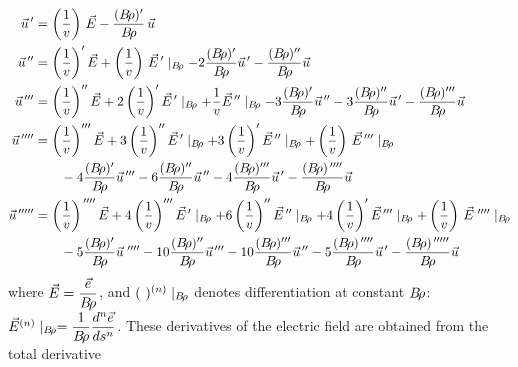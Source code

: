 \begin{equation}
	\begin{aligned}
		\vec  u^{\,\prime} 
		       & =  \left(\dfrac{1}{v}\right)\, \vec  E 
		             - \dfrac{(\Br )^\prime}{\Br} \, \vec  u\\
		\vec u^{\,\prime\prime} 
		       & =  \left(\dfrac{1}{v}\right)^\prime \vec  E 
		            + \left(\dfrac{1}{v}\right)\, \vec  E^{\,\prime} 
		            \mid_{ \Br}  -2 \dfrac{(\Br )^\prime }{ \Br} 
		             \vec  u^{\,\prime} -
		             \dfrac{(\Br)^{\prime\prime}}{\Br}  \vec  u \\
	    \vec  u^{\,\prime\prime\prime} 
	           &  = \left( \dfrac{1}{v}\right)^{\prime\prime}\vec  E
	               +2\left(\dfrac{1}{v}\right)^\prime \vec  E^{\,\prime} 
	               \mid_{ \Br} +\dfrac{1}{v} \vec  E^{\,\prime\prime} 
	               \mid_{ \Br} -3 \dfrac{(\Br )^\prime }{\Br}  \vec  u^{\,\prime\prime} 
	               -3 \dfrac{(\Br )^{\prime\prime}}{\Br}  \vec u^{\,\prime} 
	               - \dfrac{(\Br )^{\prime\prime\prime} }{\Br}  \vec  u \\
		\vec  u^{\quaprime}
		      & =  \left(\dfrac{1}{v}\right)^{\prime\prime\prime}  \vec  E 
		           +3\left(\dfrac{1}{v}\right)^{\prime\prime}\vec E^{\,\prime} \mid_{ \Br} 
		           +3\left( \dfrac{1}{v}\right)^\prime \vec  E^{\,\prime\prime} \mid_{\Br} 
		           +\left(\dfrac{1}{v}\right)\,\vec  E^{\,\prime\prime\prime} \mid_{\Br} \\
		      &  \qquad -4 \dfrac{(\Br )^\prime }{\Br}  \vec  u^{\,\prime\prime\prime} 
		           -6 \dfrac{(\Br )^{\prime\prime}}{\Br}  \vec  u^{\,\prime\prime} 
		           -4 \dfrac{(\Br )^{\prime\prime\prime} }{\Br}  \vec  u^{\,\prime} 
		           - \dfrac{(\Br )^{\quaprime}}{\Br}  \vec  u \\
             \vec  u^{\cinqprime}
		      & =  \left(\dfrac{1}{v}\right)^{\quaprime}  \vec  E 
		           +4\left(\dfrac{1}{v}\right)^{\prime\prime\prime}\vec E^{\,\prime} \mid_{ \Br} 
		           +6\left(\dfrac{1}{v}\right)^{\prime\prime}\vec E^{\,\prime\prime} \mid_{ \Br} 
		           +4\left( \dfrac{1}{v}\right)^\prime \vec  E^{\,\prime\prime\prime} \mid_{\Br} 
		           +\left(\dfrac{1}{v}\right)\,\vec  E^{\,\quaprime} \mid_{\Br} \\
		      &  \qquad -5 \dfrac{(\Br )^\prime }{\Br}  \vec  u^{\,\quaprime} 
		           -10 \dfrac{(\Br )^{\prime\prime}}{\Br}  \vec  u^{\,\prime\prime\prime} 
		           -10 \dfrac{(\Br )^{\prime\prime\prime}}{\Br}  \vec  u^{\,\prime\prime} 
		           -5 \dfrac{(\Br )^{\quaprime} }{\Br}  \vec  u^{\,\prime} 
		           - \dfrac{(\Br )^{\cinqprime}}{\Br}  \vec  u	\end{aligned}
	\label{eq2-2-10}
\end{equation}
%
where $ \vec  E=\dfrac{\vec  e}{B\!\rho} $, and $(~)^{(n)}\mid_{ B\!\rho} $ 
denotes differentiation at constant $ B\!\rho$:  
$ \vec E^{(n)}\mid_{ B\!\rho} =   \dfrac{ 1}{B\!\rho} \dfrac{d^n\vec  e }{ds^n}$.  
These derivatives of the electric field are obtained from the total 
derivative

